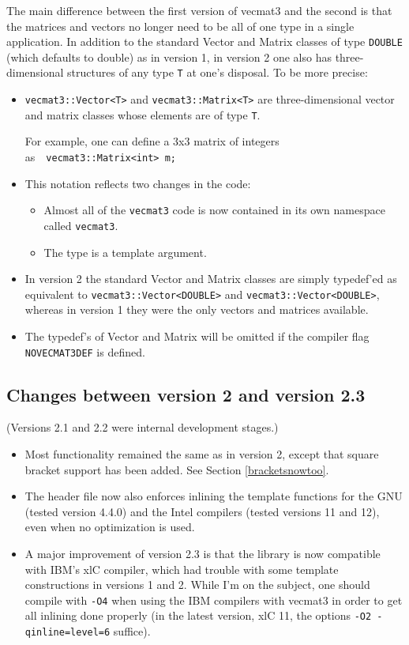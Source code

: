 \documentclass[12pt,twoside]{article}
\newcommand{\TT}{{\tt<}T{\tt>}}
\begin{document}
The main difference between the first version of vecmat3 and the
second is that the matrices and vectors no longer need to be all of
one type in a single application.  In addition to the standard Vector
and Matrix classes of type \texttt{DOUBLE} (which defaults to double)
as in version 1, in version 2 one also has three-dimensional
structures of any type \texttt{T} at one's disposal. To be more
precise:
\begin{itemize}
\item \texttt{vecmat3::Vector\TT{}} and \texttt{vecmat3::Matrix\TT{}} are
  three-dimensional vector and matrix classes whose elements are of
  type \texttt{T}. 

  For example, one can define a 3x3 matrix of integers as\ \ 
  \texttt{vecmat3::Matrix<int>~m;}
\item This notation reflects two changes in the code: 
\begin{itemize}
\item Almost all of the \texttt{vecmat3} code is now contained in its own
  namespace called \texttt{vecmat3}. 
\item The type is a template argument.
\end{itemize}
\item In version 2 the standard Vector and Matrix classes are simply
  typedef'ed as equivalent to \texttt{vecmat3::Vector<DOUBLE>} and
  \texttt{vecmat3::Vector<DOUBLE>}, whereas in version 1 they were the
  only vectors and matrices available.
\item The typedef's of Vector and Matrix will be omitted if the
  compiler flag \texttt{NOVECMAT3DEF} is defined.
\end{itemize}

\subsection*{Changes between version 2 and version 2.3}

(Versions 2.1 and 2.2 were internal development stages.)

\begin{itemize}
\item Most functionality remained the same as in version 2, except that square bracket support has been added. See Section \ref{bracketsnowtoo}.

\item The header file now also enforces inlining the template functions for
the GNU (tested version 4.4.0) and the Intel compilers (tested
versions 11 and 12), even when no optimization is used.  

\item A major improvement of version 2.3 is that the library is now
compatible with IBM's xlC compiler, which had trouble with some
template constructions in versions 1 and 2. While I'm on the
subject, one should compile with \texttt{-O4} when using the IBM
compilers with vecmat3 in order to get all inlining done properly (in
the latest version, xlC 11, the options \texttt{-O2 -qinline=level=6} suffice).
\end{itemize}
\end{document}
